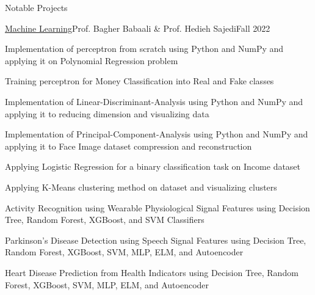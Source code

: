 \documentclass[]{main}
\begin{document}
\begin{section}{Notable Projects}
 \begin{subsection}{\href{https://github.com/ckoliber/mlexercises}{Machine Learning}}{Prof. Bagher Babaali \& Prof. Hedieh Sajedi}{Fall 2022}{}
     \item Implementation of perceptron from scratch using Python and NumPy and applying it on Polynomial Regression problem \;\href{https://github.com/ckoliber/mlexercises/blob/master/src/exercise1.ipynb}{\faExternalLink*}
     \item Training perceptron for Money Classification into Real and Fake classes \;\href{https://github.com/ckoliber/mlexercises/blob/master/src/exercise2.ipynb}{\faExternalLink*}
     \item Implementation of Linear-Discriminant-Analysis using Python and NumPy and applying it to reducing dimension and visualizing data \;\href{https://github.com/ckoliber/mlexercises/blob/master/src/exercise3.ipynb}{\faExternalLink*}
     \item Implementation of Principal-Component-Analysis using Python and NumPy and applying it to Face Image dataset compression and reconstruction \;\href{https://github.com/ckoliber/mlexercises/blob/master/src/exercise4.ipynb}{\faExternalLink*}
     \item Applying Logistic Regression for a binary classification task on Income dataset \;\href{https://github.com/ckoliber/mlexercises/blob/master/src/exercise5.ipynb}{\faExternalLink*}
     \item Applying K-Means clustering method on dataset and visualizing clusters \;\href{https://github.com/ckoliber/mlexercises/blob/master/src/exercise6.ipynb}{\faExternalLink*}
     \item Activity Recognition using Wearable Physiological Signal Features using Decision Tree, Random Forest, XGBoost, and SVM Classifiers \;\href{https://github.com/ckoliber/mlexercises/blob/master/src/exercise1_1.ipynb}{\faExternalLink*}
     \item Parkinson's Disease Detection using Speech Signal Features using Decision Tree, Random Forest, XGBoost, SVM, MLP, ELM, and Autoencoder \;\href{https://github.com/ckoliber/mlexercises/blob/master/src/exercise2_1.ipynb}{\faExternalLink*}
     \item Heart Disease Prediction from Health Indicators using Decision Tree, Random Forest, XGBoost, SVM, MLP, ELM, and Autoencoder \;\href{https://github.com/ckoliber/mlexercises/blob/master/src/project.ipynb}{\faExternalLink*}
 \end{subsection}


\end{section}
\end{document}
